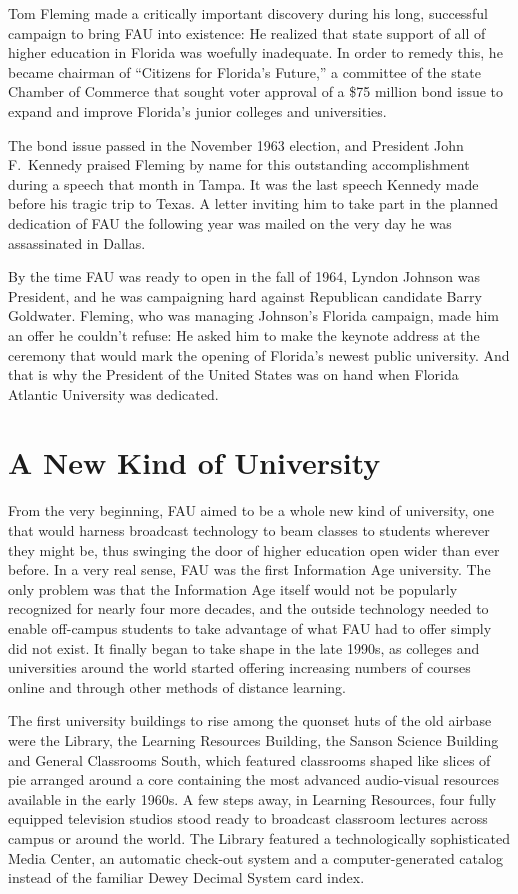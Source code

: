\documentclass[phd, 12pt, print]{fauthesis}
\begin{document}
Tom Fleming made a critically important discovery during his long, successful campaign to bring FAU into existence: He realized that state support of all of higher education in Florida was woefully inadequate.  In order to remedy this, he became chairman of ``Citizens for Florida's Future,'' a committee of the state Chamber of Commerce that sought voter approval of a \$75 million bond issue to expand and improve Florida's junior colleges and universities.

The bond issue passed in the November 1963 election, and President John F.\ Kennedy praised Fleming by name for this outstanding accomplishment during a speech that month in Tampa.  It was the last speech Kennedy made before his tragic trip to Texas.  A letter inviting him to take part in the planned dedication of FAU the following year was mailed on the very day he was assassinated in Dallas.

By the time FAU was ready to open in the fall of 1964, Lyndon Johnson was President, and he was campaigning hard against Republican candidate Barry Goldwater.  Fleming, who was managing Johnson's Florida campaign, made him an offer he couldn't refuse: He asked him to make the keynote address at the ceremony that would mark the opening of Florida's newest public university.  And that is why the President of the United States was on hand when Florida Atlantic University was dedicated.

\section{A New Kind of University}

From the very beginning, FAU aimed to be a whole new kind of university, one that would harness broadcast technology to beam classes to students wherever they might be, thus swinging the door of higher education open wider than ever before.  In a very real sense, FAU was the first Information Age university.  The only problem was that the Information Age itself would not be popularly recognized for nearly four more decades, and the outside technology needed to enable off-campus students to take advantage of what FAU had to offer simply did not exist.  It finally began to take shape in the late 1990s, as colleges and universities around the world started offering increasing numbers of courses online and through other methods of distance learning.

The first university buildings to rise among the quonset huts of the old airbase were the Library, the Learning Resources Building, the Sanson Science Building and General Classrooms South, which featured classrooms shaped like slices of pie arranged around a core containing the most advanced audio-visual resources available in the early 1960s.  A few steps away, in Learning Resources, four fully equipped television studios stood ready to broadcast classroom lectures across campus or around the world.  The Library featured a technologically sophisticated Media Center, an automatic check-out system and a computer-generated catalog instead of the familiar Dewey Decimal System card index.
\end{document}
